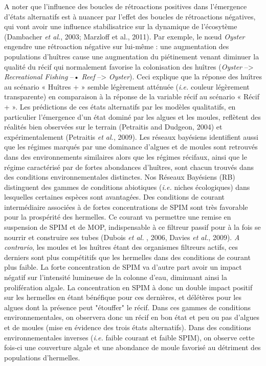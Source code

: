 \documentclass[12pt]{report}
\begin{document}
A noter que l'influence des boucles de rétroactions positives dans l'émergence d'états alternatifs est à nuancer par l'effet des boucles de rétroactions négatives, qui vont avoir une influence stabilisatrice sur la dynamique de l'écosytème (Dambacher \textit{et al.}, 2003; Marzloff et al., 2011). Par exemple, le nœud \textit{Oyster} engendre une rétroaction négative sur lui-même : une augmentation des populations d’huîtres cause une augmentation du piétinement venant diminuer la qualité du récif qui normalement favorise la colonisation des huîtres (\textit{Oyster} --> \textit{Recreational Fishing} --• \textit{Reef} --> \textit{Oyster}). Ceci explique que la réponse des huîtres au scénario « Huîtres + » semble légèrement atténuée (\textit{i.e.} couleur légèrement transparente) en comparaison à la réponse de la variable récif au scénario « Récif + ». 
\newline \newline
Les prédictions de ces états alternatifs par les modèles qualitatifs, en particulier l'émergence d'un état dominé par les algues et les moules, reflètent des réalités bien observées sur le terrain (Petraitis and Dudgeon, 2004) et expérimentalement (Petraitis \textit{et al.}, 2009). Les réseaux bayésiens identifient aussi que les régimes marqués par une dominance d’algues et de moules sont retrouvés dans des environnements similaires alors que les régimes récifaux, ainsi que le régime caractérisé par de fortes abondances d’huîtres, sont chacun trouvés dans des conditions environnementales distinctes. 
\newline \newline
Nos Réseaux Bayésiens (RB) distinguent des gammes de conditions abiotiques (\textit{i.e.} niches écologiques) dans lesquelles certaines espèces sont avantagées. Des conditions de courant intermédiaire associées à de fortes concentrations de SPIM sont très favorable pour la prospérité des hermelles. Ce courant va permettre une remise en suspension de SPIM et de MOP, indispensable à ce filtreur passif pour à la fois se nourrir et construire ses tubes (Dubois \textit{et al. }, 2006, Davies \textit{et al.}, 2009). \textit{A contrario}, les moules et les huîtres étant des organismes filtreurs actifs, ces derniers sont plus compétitifs que les hermelles dans des conditions de courant plus faible. La forte concentration de SPIM va d'autre part avoir un impact négatif sur l'intensité lumineuse de la colonne d'eau, diminuant ainsi la prolifération algale. La concentration en SPIM à donc un double impact positif sur les hermelles en étant bénéfique pour ces dernières, et délétères pour les algues dont la présence peut "étouffer" le récif. Dans ces gammes de conditions environnementales, on observera donc un récif en bon état et peu ou pas d'algues et de moules (mise en évidence des trois états alternatifs). Dans des conditions environnementales inverses (\textit{i.e.} faible courant et faible SPIM), on observe cette fois-ci une couverture algale et une abondance de moule favorisé au détriment des populations d'hermelles.
\end{document}
